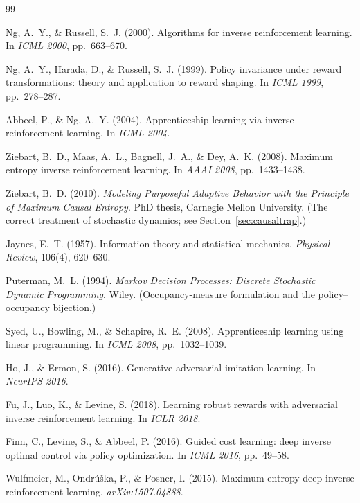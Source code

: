 \documentclass[11pt]{article}
\theoremstyle{plain}
\theoremstyle{definition}
\theoremstyle{remark}
\begin{document}
\clearpage
\begin{thebibliography}{99}

Ng, A.~Y., \& Russell, S.~J. (2000). Algorithms for inverse reinforcement
learning. In \emph{ICML 2000}, pp.~663--670.

Ng, A.~Y., Harada, D., \& Russell, S.~J. (1999). Policy invariance under
reward transformations: theory and application to reward shaping. In
\emph{ICML 1999}, pp.~278--287.

Abbeel, P., \& Ng, A.~Y. (2004). Apprenticeship learning via inverse
reinforcement learning. In \emph{ICML 2004}.

Ziebart, B.~D., Maas, A.~L., Bagnell, J.~A., \& Dey, A.~K. (2008). Maximum
entropy inverse reinforcement learning. In \emph{AAAI 2008}, pp.~1433--1438.

Ziebart, B.~D. (2010). \emph{Modeling Purposeful Adaptive Behavior with
the Principle of Maximum Causal Entropy}. PhD thesis, Carnegie Mellon
University. (The correct treatment of stochastic dynamics; see
Section~\ref{sec:causaltrap}.)

Jaynes, E.~T. (1957). Information theory and statistical mechanics.
\emph{Physical Review}, 106(4), 620--630.

Puterman, M.~L. (1994). \emph{Markov Decision Processes: Discrete
Stochastic Dynamic Programming}. Wiley. (Occupancy-measure formulation and
the policy--occupancy bijection.)

Syed, U., Bowling, M., \& Schapire, R.~E. (2008). Apprenticeship learning
using linear programming. In \emph{ICML 2008}, pp.~1032--1039.

Ho, J., \& Ermon, S. (2016). Generative adversarial imitation learning. In
\emph{NeurIPS 2016}.

Fu, J., Luo, K., \& Levine, S. (2018). Learning robust rewards with
adversarial inverse reinforcement learning. In \emph{ICLR 2018}.

Finn, C., Levine, S., \& Abbeel, P. (2016). Guided cost learning: deep
inverse optimal control via policy optimization. In \emph{ICML 2016},
pp.~49--58.

Wulfmeier, M., Ondr{\'u}{\v s}ka, P., \& Posner, I. (2015). Maximum entropy
deep inverse reinforcement learning. \emph{arXiv:1507.04888}.


\end{thebibliography}
\end{document}
